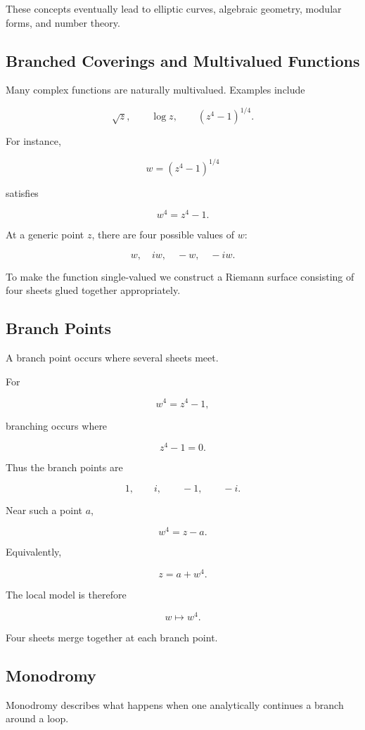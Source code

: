 \documentclass[12pt,a4paper]{article}
\theoremstyle{notespace}
\begin{document}
These concepts eventually lead to elliptic curves, algebraic geometry, modular forms, and number theory.

\subsection{Branched Coverings and Multivalued Functions}

Many complex functions are naturally multivalued. Examples include

\[
\sqrt{z},
\qquad
\log z,
\qquad
(z^4-1)^{1/4}.
\]

For instance,

\[
w=(z^4-1)^{1/4}
\]

satisfies

\[
w^4=z^4-1.
\]

At a generic point \(z\), there are four possible values of \(w\):

\[
w,\quad iw,\quad -w,\quad -iw.
\]

To make the function single-valued we construct a Riemann surface consisting of four sheets glued together appropriately.

\subsection{Branch Points}

A branch point occurs where several sheets meet.

For

\[
w^4=z^4-1,
\]

branching occurs where

\[
z^4-1=0.
\]

Thus the branch points are

\[
1,\qquad i,\qquad -1,\qquad -i.
\]

Near such a point \(a\),

\[
w^4=z-a.
\]

Equivalently,

\[
z=a+w^4.
\]

The local model is therefore

\[
w\longmapsto w^4.
\]

Four sheets merge together at each branch point.

\subsection{Monodromy}

Monodromy describes what happens when one analytically continues a branch around a loop.
\end{document}
